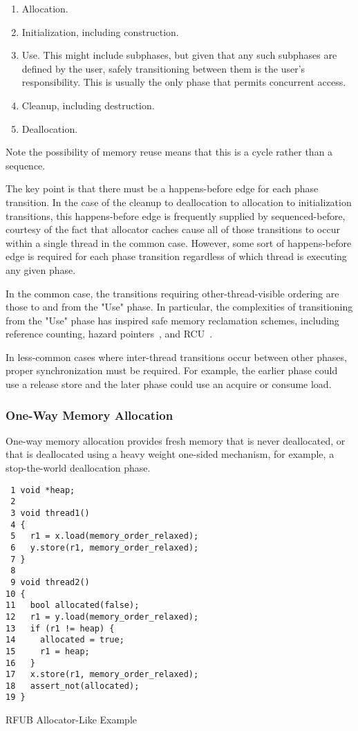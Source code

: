 \documentclass[10]{article}
\begin{document}
\begin{enumerate}
\item	Allocation.
\item	Initialization, including construction.
\item	Use.
	This might include subphases, but given that any such
	subphases are defined by the user, safely transitioning between
	them is the user's responsibility.
	This is usually the only phase that permits concurrent access.
\item	Cleanup, including destruction.
\item	Deallocation.
\end{enumerate}

Note the possibility of memory reuse means that this is a cycle rather
than a sequence.

The key point is that there must be a happens-before edge for each
phase transition.
In the case of the cleanup to deallocation to allocation to initialization
transitions, this happens-before edge is frequently supplied by
sequenced-before, courtesy of the fact that allocator caches cause
all of those transitions to occur within a single thread in the common
case.
However, some sort of happens-before edge is required for each phase
transition regardless of which thread is executing any given phase.

In the common case, the transitions requiring other-thread-visible ordering
are those to and from the "Use" phase.
In particular, the complexities of transitioning from the "Use" phase
has inspired safe memory reclamation schemes, including
reference counting,
hazard pointers~\cite{Michael02a,HerlihyLM02,MagedMichael04a},
and RCU~\cite{McKenney98}.

In less-common cases where inter-thread transitions occur between other
phases, proper synchronization must be required.
For example, the earlier phase could use a release store and
the later phase could use an acquire or consume load.

\subsubsection{One-Way Memory Allocation}
\label{sec:One-Way Memory Allocation}

One-way memory allocation provides fresh memory that is never deallocated,
or that is deallocated using a heavy weight one-sided mechanism, for
example, a stop-the-world deallocation phase.

\begin{listing}[tbp]
\begin{verbatim}
 1 void *heap;
 2
 3 void thread1()
 4 {
 5   r1 = x.load(memory_order_relaxed);
 6   y.store(r1, memory_order_relaxed);
 7 }
 8
 9 void thread2()
10 {
11   bool allocated(false);
12   r1 = y.load(memory_order_relaxed);
13   if (r1 != heap) {
14     allocated = true;
15     r1 = heap;
16   }
17   x.store(r1, memory_order_relaxed);
18   assert_not(allocated);
19 }
\end{verbatim}
\caption{RFUB Allocator-Like Example}
\label{lst:RFUB Allocator-Like Example}
\end{listing}
\end{document}
